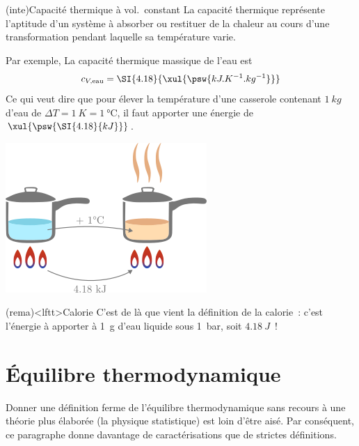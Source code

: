 \documentclass[../../main/main.tex]{subfiles}
\begin{document}
\begin{tcb*}(inte){Capacité thermique à vol.\ constant}
	La capacité thermique représente l'aptitude d'un système à absorber ou
	restituer de la chaleur au cours d'une transformation pendant laquelle sa
	température varie.
	\smallbreak
	\begin{isd}[righthand ratio=.4]
		Par exemple, La capacité thermique massique de l'eau est
		\[
			c_{V,\rm eau} = \SI{4.18}{\xul{\psw{kJ.K^{-1}.kg^{-1}}}}
		\]
		Ce qui veut dire que pour élever la température d'une casserole contenant
		$\SI{1}{kg}$ d'eau de $\Delta{T} = \SI{1}{K} = \SI{1}{\degreeCelsius}$, il
		faut apporter une énergie de $\xul{\psw{\SI{4.18}{kJ}}}$.
		\tcblower
		\begin{center}
			\includegraphics[width=\linewidth]{c_v_eau}
		\end{center}
	\end{isd}
\end{tcb*}

\begin{tcb}(rema)<lftt>{Calorie}
	C'est de là que vient la définition de la calorie~: c'est l'énergie à apporter
	à \SI{1}{g} d'eau liquide sous \SI{1}{bar}, soit $\SI{4.18}{J}$~!
\end{tcb}

\section{Équilibre thermodynamique}
Donner une définition ferme de l'équilibre thermodynamique sans recours à une
théorie plus élaborée (la physique statistique) est loin d'être aisé. Par
conséquent, ce paragraphe donne davantage de caractérisations que de strictes
définitions.
\end{document}
